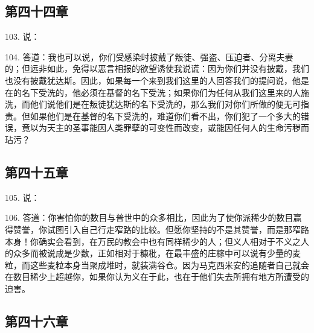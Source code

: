 
\subsection{第四十四章}

103. 说：\par

104. 答道：我也可以说，你们受感染时披戴了叛徒、强盗、压迫者、分离夫妻的；但远非如此，免得以恶言相报的欲望诱使我说谎：因为你们并没有披戴，我们也没有披戴犹达斯。因此，如果每一个来到我们这里的人回答我们的提问说，他是在的名下受洗的，他必须在基督的名下受洗；如果你们为任何从我们这里来的人施洗，而他们说他们是在叛徒犹达斯的名下受洗的，那么我们对你们所做的便无可指责。但如果他们是在基督的名下受洗的，难道你们看不出，你们犯了一个多大的错误，竟以为天主的圣事能因人类罪孽的可变性而改变，或能因任何人的生命污秽而玷污？\par


\subsection{第四十五章}

105. 说：\par

106. 答道：你害怕你的数目与普世中的众多相比，因此为了使你派稀少的数目赢得赞誉，你试图引入自己行走窄路的比较。但愿你坚持的不是其赞誉，而是那窄路本身！你确实会看到，在万民的教会中也有同样稀少的人；但义人相对于不义之人的众多而被说成是少数，正如相对于糠秕，在最丰盛的庄稼中可以说有少量的麦粒，而这些麦粒本身当聚成堆时，就装满谷仓。因为马克西米安的追随者自己就会在数目稀少上超越你，如果你认为义在于此，也在于他们失去所拥有地方所遭受的迫害。\par


\subsection{第四十六章}

